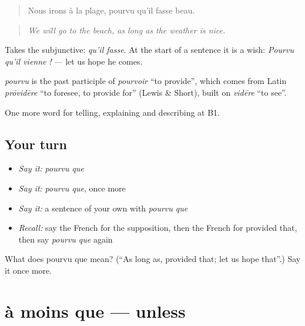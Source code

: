\begin{quote}
Nous irons à la plage, pourvu qu'il fasse beau.
\end{quote}

\begin{quote}
\emph{We will go to the beach, as long as the weather is nice.}
\end{quote}

Takes the subjunctive: \emph{qu'il fasse}. At the start of a sentence it is a wish: \emph{Pourvu qu'il vienne !} — let us hope he comes.

\begin{cousinweb}
\emph{pourvu} is the past participle of \emph{pourvoir} \textquotedblleft{}to provide\textquotedblright{}, which comes from Latin \emph{prōvidēre} \textquotedblleft{}to foresee, to provide for\textquotedblright{} (Lewis \& Short), built on \emph{vidēre} \textquotedblleft{}to see\textquotedblright{}.
\end{cousinweb}

\begin{grammarlens}[title={What you've built}]
One more word for telling, explaining and describing at B1.
\end{grammarlens}

\subsection*{Your turn}
\begin{itemize}
\raggedright
  \item \emph{Say it:} \emph{pourvu que}
  \item \emph{Say it:} \emph{pourvu que}, once more
  \item \emph{Say it:} a sentence of your own with \emph{pourvu que}
  \item \emph{Recall:} say the French for the supposition, then the French for provided that, then say \emph{pourvu que} again
\end{itemize}

\begin{tcolorbox}[breakable,colback=teal!4,colframe=teal!35!black,title={Before you move on}]
What does pourvu que mean? (\textquotedblleft{}As long as, provided that; let us hope that\textquotedblright{}.) Say it once more.
\end{tcolorbox}
\section[à moins que]{à moins que — unless}

